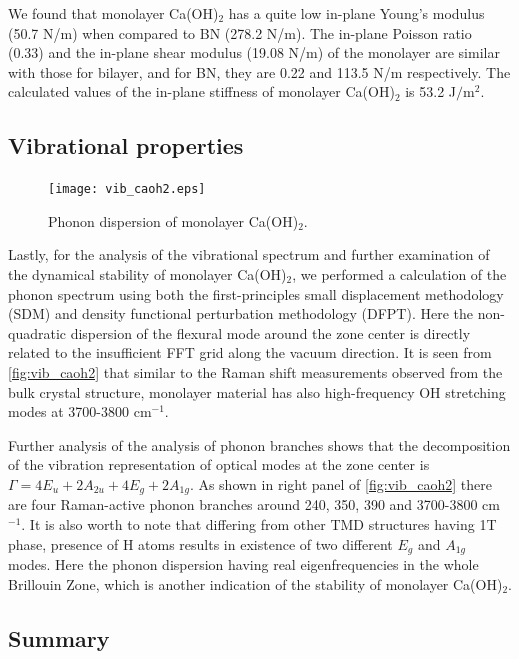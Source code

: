 We found that monolayer Ca(OH)$_2$ has a quite low in-plane Young's modulus 
(50.7 N/m) when compared to BN (278.2 N/m). The in-plane Poisson ratio (0.33) 
and the in-plane shear modulus (19.08 N/m) of the monolayer are similar with 
those for bilayer, and for BN, they are 0.22 and 113.5 N/m respectively. The 
calculated values of the in-plane stiffness of monolayer Ca(OH)$_{2}$ is 53.2 
J$/$m$^{2}$. 

\subsection{Vibrational properties}\label{stability}
\begin{figure}[htbp]
\centering
\texttt{[image: vib\_caoh2.eps]}
\caption{\label{fig:vib_caoh2} Phonon dispersion of monolayer Ca(OH)$_2$.}
\end{figure}

Lastly, for the analysis of the vibrational spectrum and further examination of 
the dynamical stability of monolayer Ca(OH)$_2$, we performed a 
calculation of the phonon spectrum using both the first-principles small 
displacement methodology (SDM)\cite{alfe} and density functional perturbation 
methodology (DFPT)\cite{baroni}. Here the non-quadratic dispersion of the 
flexural mode around the zone center is directly related to the insufficient 
FFT grid along the vacuum direction. It is seen from \autoref{fig:vib_caoh2} that 
similar to the Raman shift measurements observed from the bulk crystal 
structure, monolayer material has also high-frequency OH stretching 
modes at 3700-3800 cm$^{-1}$. 

Further analysis of the analysis of phonon 
branches shows that the decomposition of the vibration representation of optical 
modes at the zone center is $\Gamma = 4E_{u} + 2A_{2u} + 4E_{g} + 2A_{1g}$. As 
shown in right panel of \autoref{fig:vib_caoh2} there are four Raman-active phonon 
branches around 240, 350, 390 and 3700-3800 cm$^{-1}$. It is also worth to note 
that differing from other TMD structures having 1T phase, presence of H atoms 
results in existence of two different $E_{g}$ and $A_{1g}$ modes. Here the 
phonon dispersion having real eigenfrequencies in the whole Brillouin Zone, 
which is another indication of the stability of monolayer Ca(OH)$_2$.

\subsection{Summary}\label{disc}


